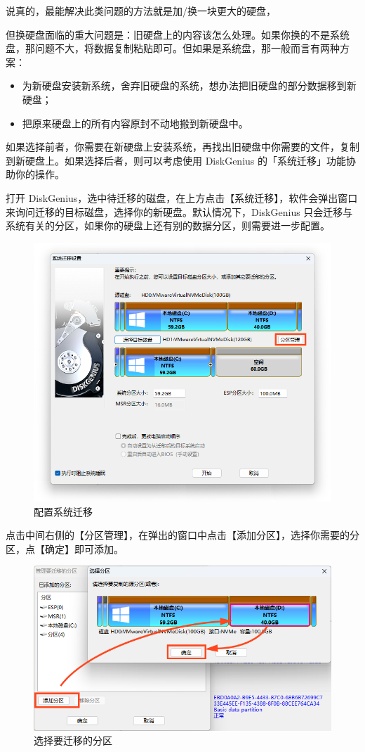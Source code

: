 {{{说真的，最能解决此类问题的方法就是加/换一块更大的硬盘，

但换硬盘面临的重大问题是：旧硬盘上的内容该怎么处理。如果你换的不是系统盘，那问题不大，将数据复制粘贴即可。但如果是系统盘，那一般而言有两种方案：

\begin{itemize}
  \item 为新硬盘安装新系统，舍弃旧硬盘的系统，想办法把旧硬盘的部分数据移到新硬盘；
  \item 把原来硬盘上的所有内容原封不动地搬到新硬盘中。
\end{itemize}

如果选择前者，你需要在新硬盘上安装系统，再找出旧硬盘中你需要的文件，复制到新硬盘上。如果选择后者，则可以考虑使用 DiskGenius 的「系统迁移」功能协助你的操作。

打开 DiskGenius，选中待迁移的磁盘，在上方点击【系统迁移】，软件会弹出窗口来询问迁移的目标磁盘，选择你的新硬盘。默认情况下，DiskGenius 只会迁移与系统有关的分区，如果你的硬盘上还有别的数据分区，则需要进一步配置。

\begin{figure}[htb!]
  \centering
  \includegraphics[width=.6\textwidth]{assets/advanced/Configure_System_Migration.png}
  \caption{配置系统迁移}
  \label{fig:Configure_System_Migration}
\end{figure}

点击中间右侧的【分区管理】，在弹出的窗口中点击【添加分区】，选择你需要的分区，点【确定】即可添加。

\begin{figure}[htb!]
  \centering
  \includegraphics[width=.6\textwidth]{assets/advanced/Select_Migrating_Partition.png}
  \caption{选择要迁移的分区}
  \label{fig:Select_Migrating_Partition}
\end{figure}

}}}

